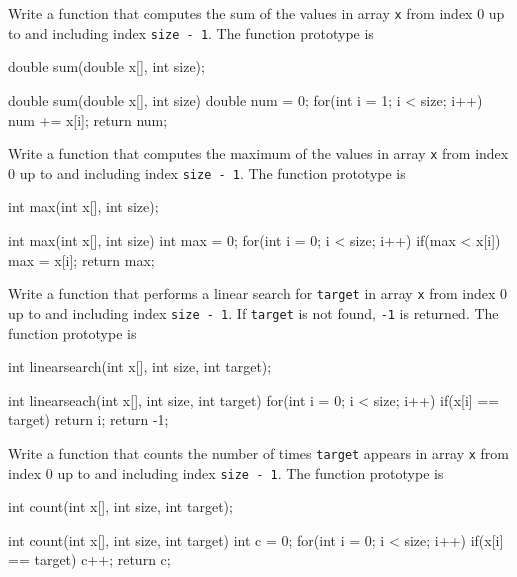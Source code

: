 

\nextq
Write a function that computes the sum of the
values in array \verb!x! from index 0 up to
and including index \verb!size - 1!.
The function prototype is
\begin{console}
double sum(double x[], int size);
\end{console}
\ANSWER
\begin{answercode}
double sum(double x[], int size)
{
  double num = 0;
  for(int i = 1; i < size; i++)
  {
    num += x[i];
  }
  return num;
}
\end{answercode}

\nextq
Write a function that
computes the maximum of the
values in array \verb!x! from index 0 up to
and including index \verb!size - 1!.
The function prototype is
\begin{console}
int max(int x[], int size);
\end{console}
\ANSWER
\begin{answercode}
int max(int x[], int size)
{
  int max = 0;
  for(int i = 0; i < size; i++)
  {
    if(max < x[i])
    {
      max = x[i];
    }
  }
  return max;
}
\end{answercode}

\nextq
Write a function that performs a linear search
for \verb!target! in array \verb!x! from index 0 up to
and including index \verb!size - 1!.
If \verb!target! is not found, \verb!-1! is returned.
The function prototype is
\begin{console}
int linearsearch(int x[], int size, int target);
\end{console}
\ANSWER
\begin{answercode}
int linearseach(int x[], int size, int target)
{
  for(int i = 0; i < size; i++)
  {
    if(x[i] == target)
    {
      return i;
    }
  }
  return -1;
}
\end{answercode}

\nextq
Write a function that counts the number of times
\verb!target! appears in
array \verb!x! from index 0 up to
and including index \verb!size - 1!.
The function prototype is
\begin{console}
int count(int x[], int size, int target);
\end{console}
\ANSWER
\begin{answercode}
int count(int x[], int size, int target)
{
  int c = 0;
  for(int i = 0; i < size; i++)
  {
    if(x[i] == target)
    {
      c++;
    }
  }
  return c;
}
\end{answercode}

